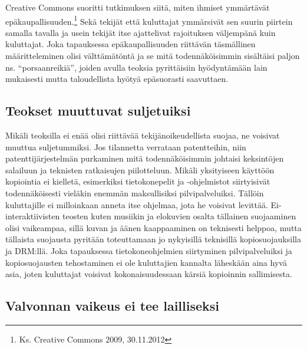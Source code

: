 \documentclass[titlepage,12pt]{article}
\begin{document}
Creative Commons suoritti tutkimuksen siitä, miten ihmiset ymmärtävät
epäkaupallisuuden.\footnote{Ks. Creative Commons 2009, 30.11.2012}
Sekä tekijät että kuluttajat ymmärsivät sen suurin piirtein samalla
tavalla ja usein tekijät itse ajattelivat rajoituksen väljempänä kuin
kuluttajat.  Joka tapauksessa epäkaupallisuuden riittävän täsmällinen
määritteleminen olisi välttämätöntä ja se mitä todennäköisimmin
sisältäisi paljon ns. ``porsaanreikiä'', joiden avulla teoksia
pyrittäisiin hyödyntämään lain mukaisesti mutta taloudellista hyötyä
epäsuorasti saavuttaen.






\subsection{Teokset muuttuvat suljetuiksi}

Mikäli teoksilla ei enää olisi riittävää tekijänoikeudellista suojaa,
ne voisivat muuttua suljetummiksi.  Jos tilannetta verrataan
patentteihin, niin patenttijärjestelmän purkaminen mitä
todennäköisimmin johtaisi keksintöjen salailuun ja teknisten
ratkaisujen piilotteluun.  Mikäli yksityiseen käyttöön kopiointia ei
kielletä, esimerkiksi tietokonepelit ja -ohjelmistot siirtyisivät
todennäköisesti vieläkin enemmän maksullisiksi pilvipalveluiksi.
Tällöin kuluttajille ei milloinkaan anneta itse ohjelmaa, jota he
voisivat levittää.  Ei-interaktiivisten teosten kuten musiikin ja
elokuvien osalta tällainen suojaaminen olisi vaikeampaa, sillä kuvan
ja äänen kaappaaminen on teknisesti helppoa, mutta tällaista suojausta
pyritään toteuttamaan jo nykyisillä teknisillä kopiosuojauksilla ja
DRM:llä.  Joka tapauksessa tietokoneohjelmien siirtyminen
pilvipalveluiksi ja kopiosuojausten tehostaminen ei ole kuluttajien
kannalta läheskään aina hyvä asia, joten kuluttajat voisivat
kokonaisuudessaan kärsiä kopioinnin sallimisesta.



\subsection{Valvonnan vaikeus ei tee lailliseksi}
\end{document}

